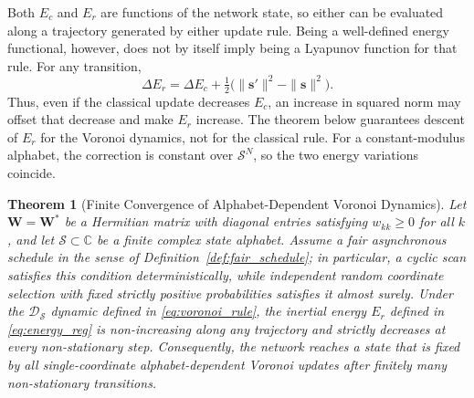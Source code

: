 \documentclass[10pt,journal,letterpaper]{IEEEtran}
\newtheorem{theorem}{Theorem}
\begin{document}
Both $E_c$ and $E_r$ are functions of the network state, so either can be
evaluated along a trajectory generated by either update rule. Being a
well-defined energy functional, however, does not by itself imply being a
Lyapunov function for that rule. For any transition,
\[
    \Delta E_r=\Delta E_c+
    \tfrac12\bigl(\|\boldsymbol{s}'\|^2-\|\boldsymbol{s}\|^2\bigr).
\]
Thus, even if the classical update decreases $E_c$, an increase in squared
norm may offset that decrease and make $E_r$ increase. The theorem below
guarantees descent of $E_r$ for the Voronoi dynamics, not for the classical
rule. For a constant-modulus alphabet, the correction is constant over
$\mathcal{S}^N$, so the two energy variations coincide.

\begin{theorem}[Finite Convergence of Alphabet-Dependent Voronoi Dynamics]
\label{thm:stability}
Let $\boldsymbol{W} = \boldsymbol{W}^*$ be a Hermitian matrix with diagonal entries satisfying $w_{kk} \ge 0$ for all $k$, and let $\mathcal{S}\subset\mathbb{C}$ be a finite complex state alphabet. Assume a fair asynchronous schedule in the sense of Definition~\ref{def:fair_schedule}; in particular, a cyclic scan satisfies this condition deterministically, while independent random coordinate selection with fixed strictly positive probabilities satisfies it almost surely.
Under the $\mathcal{D}_{\mathcal{S}}$ dynamic defined in \eqref{eq:voronoi_rule}, the inertial energy $E_r$ defined in \eqref{eq:energy_reg} is non-increasing along any trajectory and strictly decreases at every non-stationary step. Consequently, the network reaches a state that is fixed by all single-coordinate alphabet-dependent Voronoi updates after finitely many non-stationary transitions.
\end{theorem}
\end{document}
